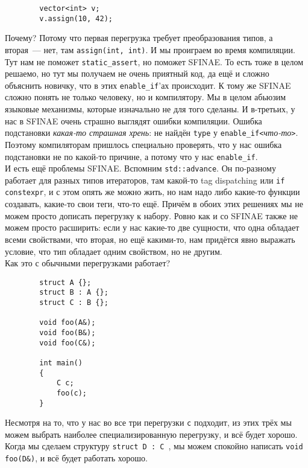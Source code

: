 \documentclass{article}
\begin{document}
    \begin{verbatim}
        vector<int> v;
        v.assign(10, 42);
    \end{verbatim}
    Почему? Потому что первая перегрузка требует преобразования типов, а вторая~--- нет, там \texttt{assign(int, int)}. И мы проиграем во время компиляции. Тут нам не поможет \texttt{static_assert}, но поможет SFINAE. То есть тоже в целом решаемо, но тут мы получаем не очень приятный код, да ещё и сложно объяснить новичку, что в этих \texttt{enable_if}'ах происходит. К тому же SFINAE сложно понять не только человеку, но и компилятору. Мы в целом абьюзим языковые механизмы, которые изначально не для того сделаны. И в-третьих, у нас в SFINAE очень страшно выглядят ошибки компиляции. Ошибка подстановки \textit{какая-то страшная хрень}: не найдён \texttt{type} у \texttt{enable_if<}\textit{что-то}\texttt{>}. Поэтому компиляторам пришлось специально проверять, что у нас ошибка подстановки не по какой-то причине, а потому что у нас \texttt{enable_if}.\\
    И есть ещё проблемы SFINAE. Вспомним \texttt{std::advance}. Он по-разному работает для разных типов итераторов, там какой-то tag dispatching или \texttt{if constexpr}, и с этом опять же можно жить, но нам надо либо какие-то функции создавать, какие-то свои теги, что-то ещё. Причём в обоих этих решениях мы не можем просто дописать перегрузку к набору. Ровно как и со SFINAE также не можем просто расширить: если у нас какие-то две сущности, что одна обладает всеми свойствами, что вторая, но ещё какими-то, нам придётся явно выражать условие, что тип обладает одним свойством, но не другим.\\
    Как это с обычными перегрузками работает?
    \begin{verbatim}
        struct A {};
        struct B : A {};
        struct C : B {};

        void foo(A&);
        void foo(B&);
        void foo(C&);

        int main()
        {
            C c;
            foo(c);
        }
    \end{verbatim}
    Несмотря на то, что у нас во все три перегрузки \texttt{c} подходит, из этих трёх мы можем выбрать наиболее специализированную перегрузку, и всё будет хорошо. Когда мы сделаем структуру \texttt{struct D : C {}}, мы можем спокойно написать \texttt{void foo(D&)}, и всё будет работать хорошо.\\
\end{document}
